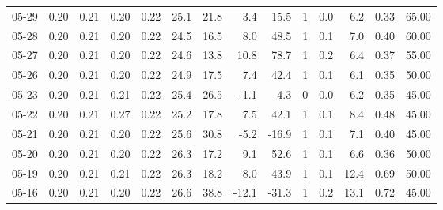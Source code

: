 \begin{threeparttable}
{\begin{tabular}{lrrrrrrrrrrrrr}
  05-29 &          0.20 &          0.21 &          0.20 &        0.22 &                25.1 &                21.8 &        3.4 &         15.5 &              1 &                 0.0 &              6.2 &            0.33 &                  65.00 \\
  05-28 &          0.20 &          0.21 &          0.20 &        0.22 &                24.5 &                16.5 &        8.0 &         48.5 &              1 &                 0.1 &              7.0 &            0.40 &                  60.00 \\
  05-27 &          0.20 &          0.21 &          0.20 &        0.22 &                24.6 &                13.8 &       10.8 &         78.7 &              1 &                 0.2 &              6.4 &            0.37 &                  55.00 \\
  05-26 &          0.20 &          0.21 &          0.20 &        0.22 &                24.9 &                17.5 &        7.4 &         42.4 &              1 &                 0.1 &              6.1 &            0.35 &                  50.00 \\
  05-23 &          0.20 &          0.21 &          0.21 &        0.22 &                25.4 &                26.5 &       -1.1 &         -4.3 &              0 &                 0.0 &              6.2 &            0.35 &                  45.00 \\
  05-22 &          0.20 &          0.21 &          0.27 &        0.22 &                25.2 &                17.8 &        7.5 &         42.1 &              1 &                 0.1 &              8.4 &            0.48 &                  45.00 \\
  05-21 &          0.20 &          0.21 &          0.20 &        0.22 &                25.6 &                30.8 &       -5.2 &        -16.9 &              1 &                 0.1 &              7.1 &            0.40 &                  45.00 \\
  05-20 &          0.20 &          0.21 &          0.20 &        0.22 &                26.3 &                17.2 &        9.1 &         52.6 &              1 &                 0.1 &              6.6 &            0.36 &                  50.00 \\
  05-19 &          0.20 &          0.21 &          0.21 &        0.22 &                26.3 &                18.2 &        8.0 &         43.9 &              1 &                 0.1 &             12.4 &            0.69 &                  50.00 \\
  05-16 &          0.20 &          0.21 &          0.20 &        0.22 &                26.6 &                38.8 &      -12.1 &        -31.3 &              1 &                 0.2 &             13.1 &            0.72 &                  45.00 \\

\end{tabular}}
\end{threeparttable}
